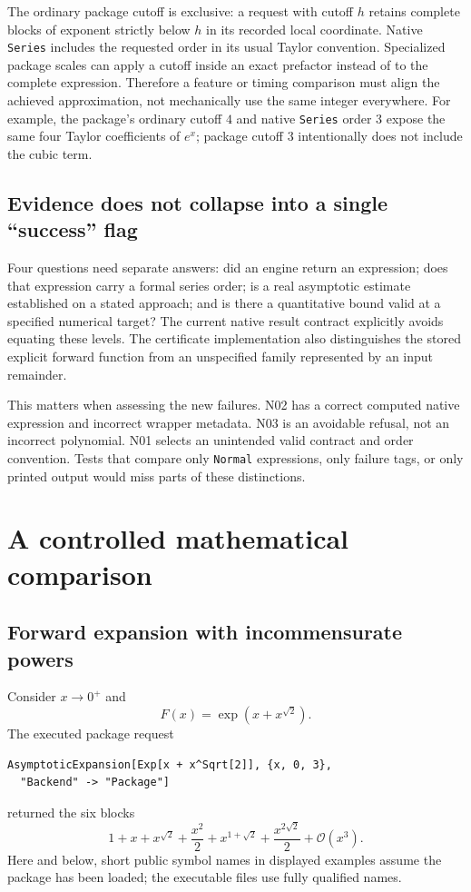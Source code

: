 \documentclass[11pt]{article}
\newcommand{\code}[1]{\texttt{#1}}
\newcommand{\q}{\sqrt{2}}
\newcommand{\Oh}{\mathcal O}
\begin{document}
The ordinary package cutoff is exclusive: a request with cutoff $h$ retains complete blocks of exponent strictly below $h$ in its recorded local coordinate. Native \code{Series} includes the requested order in its usual Taylor convention. Specialized package scales can apply a cutoff inside an exact prefactor instead of to the complete expression. Therefore a feature or timing comparison must align the achieved approximation, not mechanically use the same integer everywhere. For example, the package's ordinary cutoff $4$ and native \code{Series} order $3$ expose the same four Taylor coefficients of $e^x$; package cutoff $3$ intentionally does not include the cubic term.\cite{core,contracts,wlseries}

\subsection{Evidence does not collapse into a single ``success'' flag}
Four questions need separate answers: did an engine return an expression; does that expression carry a formal series order; is a real asymptotic estimate established on a stated approach; and is there a quantitative bound valid at a specified numerical target? The current native result contract explicitly avoids equating these levels. The certificate implementation also distinguishes the stored explicit forward function from an unspecified family represented by an input remainder.\cite{contracts,certificates}

This matters when assessing the new failures. N02 has a correct computed native expression and incorrect wrapper metadata. N03 is an avoidable refusal, not an incorrect polynomial. N01 selects an unintended valid contract and order convention. Tests that compare only \code{Normal} expressions, only failure tags, or only printed output would miss parts of these distinctions.

\section{A controlled mathematical comparison}
\label{sec:oracle}
\subsection{Forward expansion with incommensurate powers}
Consider $x\to0^+$ and
\[
 F(x)=\exp(x+x^{\q}).
\]
The executed package request
\begin{lstlisting}
AsymptoticExpansion[Exp[x + x^Sqrt[2]], {x, 0, 3},
  "Backend" -> "Package"]
\end{lstlisting}
returned the six blocks
\begin{equation}
 1+x+x^{\q}+\frac{x^2}{2}+x^{1+\q}
   +\frac{x^{2\q}}{2}+\Oh(x^3).
 \label{eq:forward}
\end{equation}
Here and below, short public symbol names in displayed examples assume the package has been loaded; the executable files use fully qualified names.
\end{document}
